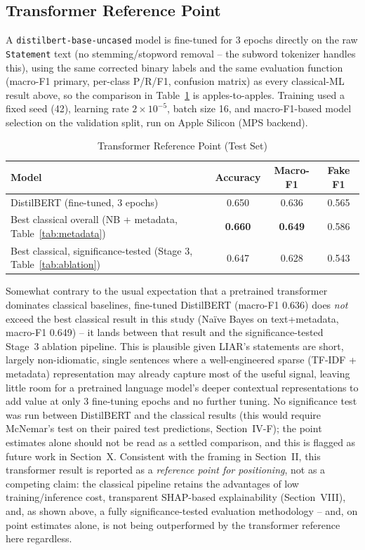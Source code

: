 \documentclass[conference]{IEEEtran}
\begin{document}
\subsection{Transformer Reference Point}
A \texttt{distilbert-base-uncased} model \cite{sanh2019distilbert} is fine-tuned
for 3 epochs directly on the raw \texttt{Statement} text (no stemming/stopword
removal -- the subword tokenizer handles this), using the same corrected binary
labels and the same evaluation function (macro-F1 primary, per-class P/R/F1,
confusion matrix) as every classical-ML result above, so the comparison in
Table~\ref{tab:transformer} is apples-to-apples. Training used a fixed seed (42),
learning rate $2\times10^{-5}$, batch size 16, and macro-F1-based model selection
on the validation split, run on Apple Silicon (MPS backend).

\begin{table}[!t]
\caption{Transformer Reference Point (Test Set)}
\label{tab:transformer}
\centering
\begin{tabular}{lccc}
\toprule
Model & Accuracy & Macro-F1 & Fake F1 \\
\midrule
DistilBERT (fine-tuned, 3 epochs) & 0.650 & 0.636 & 0.565 \\
Best classical overall (NB + metadata, Table~\ref{tab:metadata}) & \textbf{0.660} & \textbf{0.649} & 0.586 \\
Best classical, significance-tested (Stage 3, Table~\ref{tab:ablation}) & 0.647 & 0.628 & 0.543 \\
\bottomrule
\end{tabular}
\end{table}

Somewhat contrary to the usual expectation that a pretrained transformer
dominates classical baselines, fine-tuned DistilBERT (macro-F1 0.636) does
\emph{not} exceed the best classical result in this study (Na\"ive Bayes on
text+metadata, macro-F1 0.649) -- it lands between that result and the
significance-tested Stage~3 ablation pipeline. This is plausible given LIAR's
statements are short, largely non-idiomatic, single sentences where a
well-engineered sparse (TF-IDF + metadata) representation may already capture most
of the useful signal, leaving little room for a pretrained language model's deeper
contextual representations to add value at only 3 fine-tuning epochs and no
further tuning. No significance test was run between DistilBERT and the classical
results (this would require McNemar's test on their paired test predictions,
Section~IV-F); the point estimates alone should not be read as a settled
comparison, and this is flagged as future work in Section~X. Consistent with the
framing in Section~II, this transformer result is reported as a \emph{reference
point for positioning}, not as a competing claim: the classical pipeline retains
the advantages of low training/inference cost, transparent SHAP-based
explainability (Section~VIII), and, as shown above, a fully significance-tested
evaluation methodology -- and, on point estimates alone, is not being outperformed
by the transformer reference here regardless.
\end{document}
